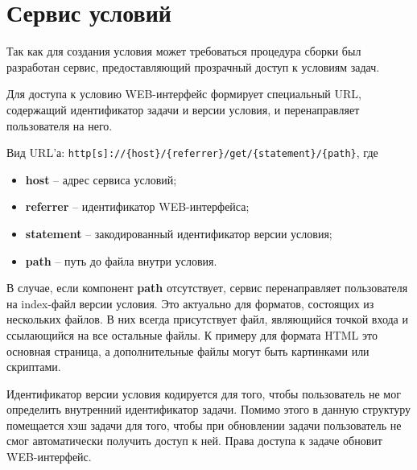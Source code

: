 \section{Сервис условий}
Так как для создания условия может требоваться процедура сборки
был разработан сервис, предоставляющий прозрачный доступ к условиям задач.

Для доступа к условию WEB-интерфейс формирует специальный URL,
содержащий идентификатор задачи и версии условия, и перенаправляет
пользователя на него.

Вид URL'а: \verb=http[s]://{host}/{referrer}/get/{statement}/{path}=,
где
\begin{itemize}
    \item \textbf{host} -- адрес сервиса условий;
    \item \textbf{referrer} -- идентификатор WEB-интерфейса;
    \item \textbf{statement} -- закодированный идентификатор версии условия;
    \item \textbf{path} -- путь до файла внутри условия.
\end{itemize}

В случае, если компонент \textbf{path} отсутствует,
сервис перенаправляет пользователя на index-файл версии условия.
Это актуально для форматов, состоящих из нескольких файлов.
В них всегда присутствует файл, являющийся точкой входа
и ссылающийся на все остальные файлы.
К примеру для формата HTML это основная страница,
а дополнительные файлы могут быть картинками или скриптами.

Идентификатор версии условия кодируется для того,
чтобы пользователь не мог определить внутренний
идентификатор задачи. Помимо этого
в данную структуру помещается хэш задачи
для того, чтобы при обновлении задачи
пользователь не смог автоматически получить доступ к ней.
Права доступа к задаче обновит WEB-интерфейс.

